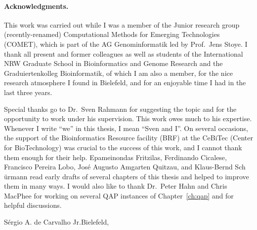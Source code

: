 \paragraph{Acknowledgments.}
This work was carried out while I was a member of the Junior research group
(recently-renamed) Computational Methods for Emerging Technologies (COMET), which
is part of the AG Genominformatik led by Prof.~Jens Stoye. I thank all present
and former colleagues as well as students of the International NRW Graduate
School in Bioinformatics and Genome Research and the Graduiertenkolleg
Bioinformatik, of which I am also a member, for the nice research atmosphere I
found in Bielefeld, and for an enjoyable time I had in the last three years.

Special thanks go to Dr.~Sven Rahmann for suggesting the topic and for the
opportunity to work under his supervision. This work owes much to his expertise.
Whenever I write ``we'' in this thesis, I mean ``Sven and I''. On several
occasions, the support of the Bioinformatics Resource facility (BRF) at the
CeBiTec (Center for BioTechnology) was crucial to the success of this work,
and I cannot thank them enough for their help. Epameinondas Fritzilas,
Ferdinando Cicalese, Francisco Pereira Lobo, Jos\'e Augusto Amgarten Quitzau,
and Klaus-Bernd Sch \"urmann read early drafts of several chapters of this
thesis and helped to improve them in many ways. I would also like to thank
Dr.~Peter Hahn and Chris MacPhee for working on several QAP instances of
Chapter~\ref{ch:qap} and for helpful discussions.

\vspace*{6ex}
S\'ergio A. de Carvalho Jr.\hfill Bielefeld, \handindate
